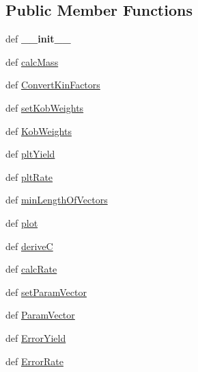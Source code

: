 \subsection*{\-Public \-Member \-Functions}
\begin{DoxyCompactItemize}
\item 
\hypertarget{classFit__one__run_1_1KobayashiA2_a7eea093af89e02cb275ea803f1444289}{def {\bfseries \-\_\-\-\_\-init\-\_\-\-\_\-}}\label{classFit__one__run_1_1KobayashiA2_a7eea093af89e02cb275ea803f1444289}

\item 
def \hyperlink{classFit__one__run_1_1KobayashiA2_a9b6b0c05b852f733c38af2cbf9bc06cf}{calc\-Mass}
\item 
def \hyperlink{classFit__one__run_1_1KobayashiA2_ae7b700369eb257639a007f3b8879af71}{\-Convert\-Kin\-Factors}
\item 
def \hyperlink{classFit__one__run_1_1KobayashiA2_a9fe212c0a65f536a7cb894c53a4fcca2}{set\-Kob\-Weights}
\item 
def \hyperlink{classFit__one__run_1_1KobayashiA2_acc88fcf352ccd8696ca24feedee248ec}{\-Kob\-Weights}
\item 
def \hyperlink{classFit__one__run_1_1Model_aa304b32155938a713c33f0dc03a135f3}{plt\-Yield}
\item 
def \hyperlink{classFit__one__run_1_1Model_a9c28d95902adf00f5aaa642f0919fc61}{plt\-Rate}
\item 
def \hyperlink{classFit__one__run_1_1Model_a26fc879ca33c9171ebb4a97bc4b0c46b}{min\-Length\-Of\-Vectors}
\item 
def \hyperlink{classFit__one__run_1_1Model_a98159c954f1f1be2a34be3ea53d11493}{plot}
\item 
def \hyperlink{classFit__one__run_1_1Model_ace9df4177c5ae753dbe190e2f8268149}{derive\-C}
\item 
def \hyperlink{classFit__one__run_1_1Model_a07ae4534de2a6ef241d71facdffb227e}{calc\-Rate}
\item 
def \hyperlink{classFit__one__run_1_1Model_a174aec9b05dbe01ec103f7ba75d6516c}{set\-Param\-Vector}
\item 
def \hyperlink{classFit__one__run_1_1Model_a3c9239f0ac062fdae0bda395636c0372}{\-Param\-Vector}
\item 
def \hyperlink{classFit__one__run_1_1Model_aa2bc4ba19704350fb2ff441734b51b10}{\-Error\-Yield}
\item 
def \hyperlink{classFit__one__run_1_1Model_aad63c345c343f0c7d1cf20135dc0a0e5}{\-Error\-Rate}
\end{DoxyCompactItemize}
